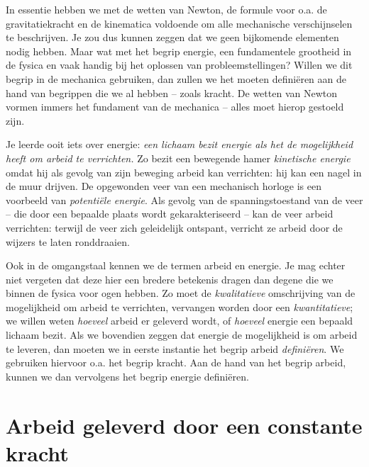 \documentclass{ximera}
\begin{document}
	\author{Bart Lambregs}



	In essentie hebben we met de wetten van Newton, de formule voor o.a. de gravitatiekracht en de kinematica voldoende om alle mechanische verschijnselen te beschrijven. Je zou dus kunnen zeggen dat we geen bijkomende elementen nodig hebben. Maar wat met het begrip energie, een fundamentele grootheid in de fysica en vaak handig bij het oplossen van probleemstellingen?  Willen we dit begrip in de mechanica gebruiken, dan zullen we het moeten defini\"eren aan de hand van begrippen die we al hebben -- zoals kracht. De wetten van Newton vormen immers het fundament van de mechanica -- alles moet hierop gestoeld zijn. 
	
	Je leerde ooit iets over energie: \textit{een lichaam bezit energie als het de mogelijkheid heeft om arbeid te verrichten.} Zo bezit een bewegende hamer \textit{kinetische energie} omdat hij als gevolg van zijn beweging arbeid kan verrichten: hij kan een nagel in de muur drijven. De opgewonden veer
	van een mechanisch horloge is een voorbeeld van \textit{potenti\"ele energie}. Als gevolg van de spanningstoestand van de veer -- die door een bepaalde plaats wordt gekarakteriseerd -- kan de veer arbeid verrichten: terwijl de veer zich geleidelijk ontspant, verricht ze arbeid door de wijzers te laten ronddraaien. %
	
	Ook in de omgangstaal kennen we de termen arbeid en energie. Je mag echter niet vergeten dat deze hier een bredere betekenis dragen dan degene die we binnen de fysica voor ogen hebben. Zo moet de \textit{kwalitatieve} omschrijving van de mogelijkheid om arbeid te verrichten, vervangen worden door een \textit{kwantitatieve}; we willen weten \textit{hoeveel} arbeid er geleverd wordt, of \textit{hoeveel} energie een bepaald lichaam bezit. Als we bovendien zeggen dat energie de mogelijkheid is om arbeid te leveren, dan moeten we in eerste instantie het begrip arbeid \textit{defini\"eren}. We gebruiken hiervoor o.a. het begrip kracht. Aan de hand van het begrip arbeid, kunnen we dan vervolgens het begrip energie defini\"eren.
	
	

	
	\section{Arbeid geleverd door een constante kracht}
	
\end{document}
